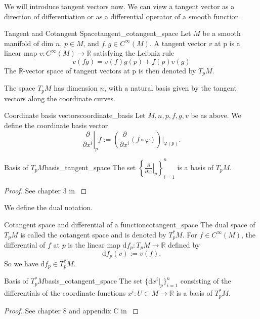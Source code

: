 We will introduce tangent vectors now. We can view a tangent vector as a direction of differentiation or as a differential operator of a smooth function.
\begin{colordef}{Tangent and Cotangent Space}{tangent_cotangent_space}
Let $M$ be a smooth manifold of dim $n$, $p \in M$, and $f,g\in C^\infty(M)$. A tangent vector $v$ at p is a linear map $v: C^\infty(M) \to \mathbb{R}$ satisfying the Leibniz rule
\[
v(fg) = v(f)g(p) + f(p)v(g)
\]
The $\mathbb{R}$-vector space of tangent vectors at p is then denoted by $T_pM$.
\end{colordef}

The space $T_pM$ has dimension $n$, with a natural basis given by the tangent vectors along the coordinate curves. 


\begin{colordef}{Coordinate basis vectors}{coordinate_basis}
Let $M,n,p,f,g,v$ be as above. 
We define the coordinate basis vector
$$\left.\frac{\partial}{\partial x^i}\right|_p f := \left(\frac{\partial}{\partial x^i} (f \circ \varphi)\right) \bigg|_{\varphi(p)}.$$
\end{colordef}

\begin{colorlem}{Basis of $T_pM$}{basis_tangent_space}
The set $\left\{\left.\frac{\partial}{\partial x^i}\right|_p\right\}_{i=1}^n$ is a basis of $T_pM$. 
\end{colorlem}
\begin{proof}
See chapter 3 in \cite{tsakanikas2024dg2}
\end{proof}

We define the dual notation.

\begin{colordef}{Cotangent space and differential of a function}{cotangent_space}
The dual space of $T_pM$ is called the cotangent space and is denoted by $T_p^*M$. For $f \in C^\infty(M)$, the differential of $f$ at $p$ is the linear map $\mathrm{d}f_p: T_pM \to \mathbb{R}$ defined by
$$\mathrm{d}f_p(v) := v(f).$$
So we have $\mathrm{d}f_p\in T_p^*M$.
\end{colordef}

\begin{colorlem}{Basis of $T_p^*M$}{basis_cotangent_space}
The set $\{\mathrm{d}x^i|_p\}_{i=1}^n$ consisting of the differentials of the coordinate functions $x^i: U\subset M \to \mathbb{R}$ is a basis of $T_p^*M$. 
\end{colorlem}
\begin{proof}
See chapter 8 and appendix C in \cite{tsakanikas2024dg2}
\end{proof}


